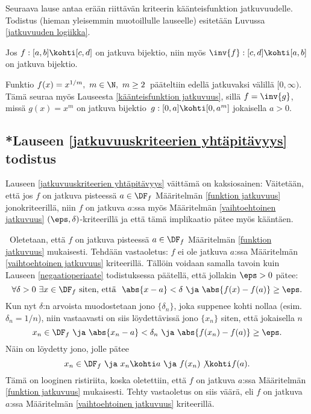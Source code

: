 Seuraava lause antaa erään riittävän kriteerin käänteisfunktion jatkuvuudelle. Todistus
(hieman yleisemmin muotoillulle lauseelle) esitetään Luvussa \ref{jatkuvuuden logiikka}.
\begin{*Lause} \label{käänteisfunktion jatkuvuus}
 Jos $f:[a,b] \kohti [c,d]$ on jatkuva bijektio, niin myös 
$\inv{f}:[c,d] \kohti [a,b]$ on jatkuva bijektio.
\end{*Lause} 
\begin{Exa} Funktio $f(x)=x^{1/m},\ m \in \N,\ m \ge 2\,$ pääteltiin edellä jatkuvaksi välillä 
$[0,\infty)$. Tämä seuraa myös Lauseesta \ref{käänteisfunktion jatkuvuus}, sillä $f=\inv{g}$,
missä $g(x)=x^m$ on jatkuva bijektio $\,g: [0,a] \kohti [0,a^m]$ jokaisella $a>0$. \loppu
\end{Exa}

\subsection{*Lauseen \ref{jatkuvuuskriteerien yhtäpitävyys} todistus}

Lauseen \ref{jatkuvuuskriteerien yhtäpitävyys} väittämä on kaksiosainen: Väitetään, että
jos $f$ on jatkuva pisteessä $a\in\DF_f$ Määritelmän \ref{funktion jatkuvuus}
jonokriteerillä, niin $f$ on jatkuva $a$:ssa myös Määritelmän
\ref{vaihtoehtoinen jatkuvuus} $(\eps,\delta)$-kriteerillä ja että tämä
implikaatio pätee myös kääntäen.
 
\tod\, \fbox{$\impl$} Oletetaan, että $f$ on jatkuva pisteessä $a\in\DF_f$  Määritelmän 
\ref{funktion jatkuvuus} mukaisesti. Tehdään vastaoletus: $f$ ei ole jatkuva $a$:ssa
Määritelmän \ref{vaihtoehtoinen jatkuvuus} kriteerillä. Tällöin voidaan
samalla tavoin kuin Lauseen \ref{negaatioperiaate} todistuksessa päätellä, että jollakin 
$\eps>0$ pätee:
\[
\forall \delta>0 \ \exists x\in\DF_f\ \text{siten, että}\ \ 
                   \abs{x-a}<\delta \ \ja\ \abs{f(x)-f(a)}\ge\eps.
\]
Kun nyt $\delta$:n arvoista muodostetaan jono $\{\delta_n\}$, joka suppenee kohti nollaa 
(esim.\ $\delta_n=1/n$), niin vastaavasti on siis löydettävissä jono $\{x_n\}$ siten, että
jokaisella $n$
\[
x_n\in\DF_f\ \ja\ \abs{x_n-a}<\delta_n \ \ja \ \abs{f(x_n)-f(a)}\ge\eps.
\]
Näin on löydetty jono, jolle pätee
\[
x_n\in\DF_f\ \ja\ x_n \kohti a\ \ja\ f(x_n) \not\kohti f(a).
\]
Tämä on looginen ristiriita, koska oletettiin, että $f$ on jatkuva $a$:ssa Määritelmän
\ref{funktion jatkuvuus} mukaisesti. Tehty vastaoletus on siis väärä, eli $f$ on jatkuva
$a$:ssa Määritelmän \ref{vaihtoehtoinen jatkuvuus} kriteerillä. 

